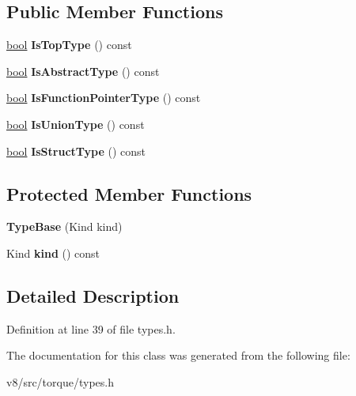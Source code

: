 \subsection*{Public Member Functions}
\begin{DoxyCompactItemize}
\item 
\mbox{\label{classv8_1_1internal_1_1torque_1_1TypeBase_abe70a1910f05986eae93a71b70440a66}} 
\mbox{\hyperlink{classbool}{bool}} {\bfseries Is\+Top\+Type} () const
\item 
\mbox{\label{classv8_1_1internal_1_1torque_1_1TypeBase_a7a3cadcbf9981855c8f567dc0a9f4d89}} 
\mbox{\hyperlink{classbool}{bool}} {\bfseries Is\+Abstract\+Type} () const
\item 
\mbox{\label{classv8_1_1internal_1_1torque_1_1TypeBase_a70f0b48f5f77e7515391d2e5fe8ba7f5}} 
\mbox{\hyperlink{classbool}{bool}} {\bfseries Is\+Function\+Pointer\+Type} () const
\item 
\mbox{\label{classv8_1_1internal_1_1torque_1_1TypeBase_ab2f14a23e78702e44ccf5c3df29dad1f}} 
\mbox{\hyperlink{classbool}{bool}} {\bfseries Is\+Union\+Type} () const
\item 
\mbox{\label{classv8_1_1internal_1_1torque_1_1TypeBase_a2fd8ec504e73deeefcd6547e4e006e70}} 
\mbox{\hyperlink{classbool}{bool}} {\bfseries Is\+Struct\+Type} () const
\end{DoxyCompactItemize}
\subsection*{Protected Member Functions}
\begin{DoxyCompactItemize}
\item 
\mbox{\label{classv8_1_1internal_1_1torque_1_1TypeBase_ab0e92b2fbedb7a75e3152522ddbc1e71}} 
{\bfseries Type\+Base} (Kind kind)
\item 
\mbox{\label{classv8_1_1internal_1_1torque_1_1TypeBase_a982bab06fe872a73f18a71bda9d606e0}} 
Kind {\bfseries kind} () const
\end{DoxyCompactItemize}


\subsection{Detailed Description}


Definition at line 39 of file types.\+h.



The documentation for this class was generated from the following file\+:\begin{DoxyCompactItemize}
\item 
v8/src/torque/types.\+h\end{DoxyCompactItemize}
